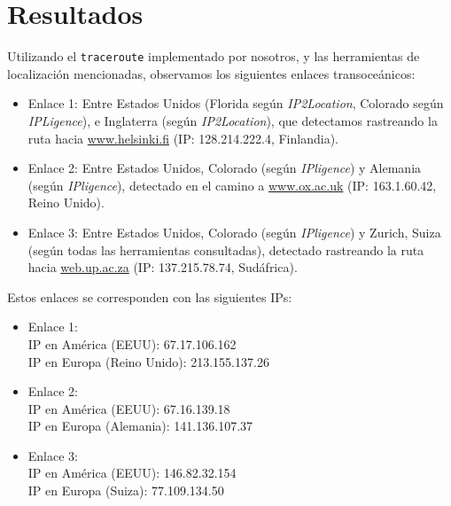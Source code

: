 \section{Resultados}


Utilizando el \texttt{traceroute} implementado por nosotros, y las herramientas de localizaci\'on mencionadas, observamos los siguientes enlaces transoce\'anicos:

\begin{itemize}
 \item Enlace 1: Entre Estados Unidos (Florida seg\'un \emph{IP2Location}, Colorado seg\'un \emph{IPLigence}), e Inglaterra (seg\'un \emph{IP2Location}), que detectamos rastreando la ruta hacia \url{www.helsinki.fi} (IP: 128.214.222.4, Finlandia).
 \item Enlace 2: Entre Estados Unidos, Colorado (seg\'un \emph{IPligence}) y Alemania (seg\'un \emph{IPligence}), detectado en el camino a \url{www.ox.ac.uk} (IP: 163.1.60.42, Reino Unido).
 \item Enlace 3: Entre Estados Unidos, Colorado (seg\'un \emph{IPligence}) y Zurich, Suiza (seg\'un todas las herramientas consultadas), detectado rastreando la ruta hacia \url{web.up.ac.za} (IP: 137.215.78.74, Sud\'africa).
\end{itemize}

Estos enlaces se corresponden con las siguientes IPs:

\begin{itemize}
 \item Enlace 1:\\
    IP en Am\'erica (EEUU): 67.17.106.162\\
    IP en Europa (Reino Unido): 213.155.137.26
  \item Enlace 2:\\
    IP en Am\'erica (EEUU): 67.16.139.18\\
    IP en Europa (Alemania): 141.136.107.37
  \item Enlace 3:\\
    IP en Am\'erica (EEUU): 146.82.32.154\\
    IP en Europa (Suiza): 77.109.134.50
\end{itemize}


